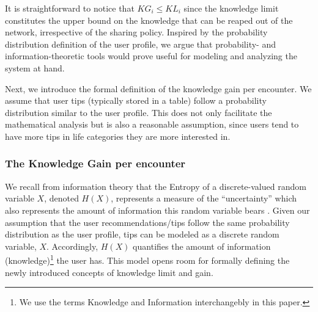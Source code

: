 \documentclass[12pt,epsf]{article}
\theoremstyle{definition}
\begin{document}
It is straightforward to notice that $KG_i \le KL_i$ since the knowledge limit constitutes the upper bound on the knowledge that can be reaped out of the network, irrespective of the sharing policy. Inspired by the probability distribution definition of the user profile, we argue that probability- and information-theoretic tools would prove useful for modeling and analyzing the system at hand.

Next, we introduce the formal definition of the knowledge gain per encounter. We assume that user tips (typically stored in a table) follow a probability distribution similar to the user profile. This does not only facilitate the mathematical analysis but is also a reasonable assumption, since users tend to have more tips in life categories they are more interested in.
%

%
\vspace{-0.3 cm}
\subsubsection{The Knowledge Gain per encounter}
\vspace{-0.2 cm}
We recall from information theory that the Entropy of a discrete-valued random variable $X$, denoted $H(X)$, represents a measure of the ``uncertainty'' which also represents the amount of information this random variable bears \cite{cover}. Given our assumption that the user recommendations/tips follow the same probability distribution as the user profile, tips can be modeled as a discrete random variable, $X$. Accordingly, $H(X)$ 
quantifies the amount of information (knowledge)\footnote{We use the terms Knowledge and Information interchangebly in this paper.} the user has. This model opens room for formally defining the newly introduced concepts of knowledge limit and gain.
\end{document}
